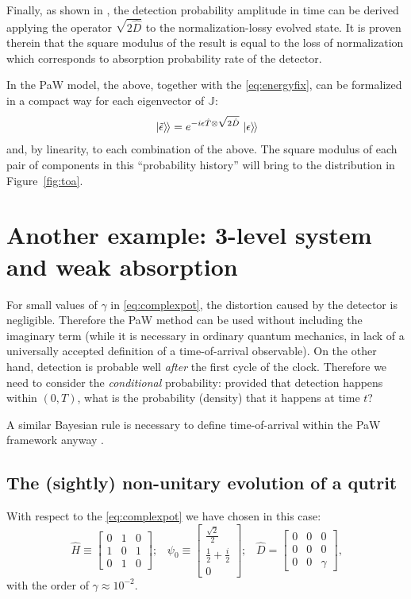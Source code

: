 \documentclass[a0,portrait]{a0poster}
\newcommand{\ox}{\otimes}
\DeclareMathOperator*{\repr}{\equiv}      %
\newcommand{\smallback}{\hspace{-0.115em}}
\newcommand{\dket}[1]{\left.\left| #1 \right\rangle\smallback\right\rangle}
\begin{document}
\begin{multicols}{2}
Finally, as shown in \cite{RuschhauptAbsorption}, the detection probability amplitude
in time
can be derived applying the operator $\sqrt{2\hat{D}}$ to the normalization-lossy
evolved state. It is proven therein that the square modulus of the result is equal
to the loss of normalization which corresponds to absorption probability rate of the detector.

In the PaW model, the above, together with the \eqref{eq:energyfix},
can be formalized in a compact way for each eigenvector of $\mathbb{J}$:
\begin{equation}
  \dket{\tilde{\epsilon}} = e^{-i\epsilon\hat{T} \ox \sqrt{2\hat{D}}} \dket{\epsilon}
\end{equation}
and, by linearity, to each combination of the above. The square modulus of
each pair of components in this ``probability history'' will bring to the distribution
in Figure~\ref{fig:toa}.

\section*{Another example: 3-level system and weak absorption}

For small values of $\gamma$ in \eqref{eq:complexpot},
the distortion caused by the detector is negligible.
Therefore the PaW method can be used without including the imaginary term
(while it is necessary in ordinary quantum mechanics,
in lack of a universally accepted definition of a time-of-arrival observable).
On the other hand, detection is probable well \emph{after} the first cycle of the clock.
Therefore we need to consider the \emph{conditional} probability: provided that detection happens
within $(0, T)$, what is the probability (density) that it happens at time $t$?

A similar Bayesian rule is necessary to define time-of-arrival within the PaW framework
anyway \cite{Maccone:QMOT}.

\subsection*{The (sightly) non-unitary evolution of a qutrit}
With respect to the \eqref{eq:complexpot} we have chosen in this case:
\begin{equation}
  \hat{H} \repr \left[\begin{matrix}0 & 1 & 0\\1 & 0 & 1\\0 & 1 & 0\end{matrix}\right] \text{;} \quad
  \psi_0 \repr \left[\begin{matrix}\frac{\sqrt{2}}{2}\\\frac{1}{2} + \frac{i}{2}\\0\end{matrix}\right] \text{;} \quad
  \hat{D} = \left[\begin{matrix}0 & 0 & 0\\0 & 0 & 0\\0 & 0 & \gamma\end{matrix}\right] \text{,}
\end{equation}
with the order of $\gamma \approx 10^{-2}$.


\end{multicols}
\end{document}
